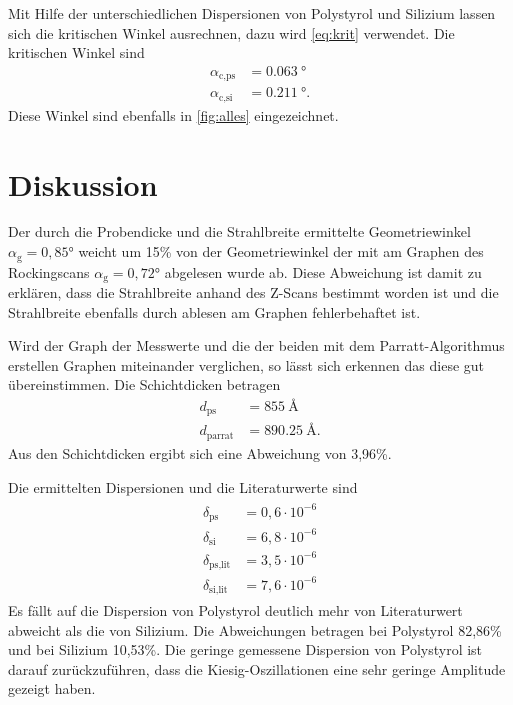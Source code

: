 Mit Hilfe der unterschiedlichen Dispersionen von Polystyrol und Silizium lassen sich die kritischen Winkel ausrechnen,
dazu wird \autoref{eq:krit} verwendet.
Die kritischen Winkel sind
\begin{align*}
    \alpha_\text{c,ps}& = \SI{0,063}{\degree}\\
    \alpha_\text{c,si}& = \SI{0.211}{\degree}.
\end{align*}
Diese Winkel sind ebenfalls in \autoref{fig:alles} eingezeichnet.

\section{Diskussion}
Der durch die Probendicke und die Strahlbreite ermittelte Geometriewinkel $\alpha_\text{g} =0,85°$ weicht um 15\%
von der Geometriewinkel der mit am Graphen des Rockingscans $\alpha_\text{g} =0,72°$ abgelesen wurde ab. 
Diese Abweichung ist damit zu erklären, dass die Strahlbreite anhand des Z-Scans bestimmt worden ist und die Strahlbreite
ebenfalls durch ablesen am Graphen fehlerbehaftet ist.

Wird der Graph der Messwerte und die der beiden mit dem Parratt-Algorithmus erstellen Graphen miteinander verglichen, so lässt sich 
erkennen das diese gut übereinstimmen.
Die Schichtdicken betragen
\begin{align*}
    d_\text{ps} &= \SI{855}{\angstrom}\\
    d_\text{parrat} &= \SI{890,25}{\angstrom}.
\end{align*}
Aus den Schichtdicken ergibt sich eine Abweichung von 3,96\%.

Die ermittelten Dispersionen und die Literaturwerte\cite{V44old} sind
\begin{align}
    \begin{split}    
        \delta_\text{ps} &= 0,6\cdot 10^{-6}\\
        \delta_\text{si}&= 6,8\cdot 10^{-6} \\
        \delta_\text{ps,lit} &= 3,5\cdot 10^{-6}\\
        \delta_\text{si,lit}&= 7,6\cdot 10^{-6}
    \end{split} 
\end{align}
Es fällt auf die Dispersion von Polystyrol deutlich mehr von Literaturwert abweicht als die von Silizium.
Die Abweichungen betragen bei Polystyrol 82,86\% und bei Silizium 10,53\%.
Die geringe gemessene Dispersion von Polystyrol ist darauf zurückzuführen, dass die Kiesig-Oszillationen eine
sehr geringe Amplitude gezeigt haben.

